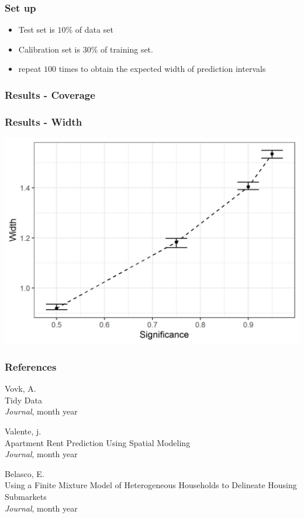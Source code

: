 \documentclass{beamer}
\begin{document}
\begin{frame} \frametitle{Set up}
\begin{itemize}
	\item Test set is $10\%$ of data set
	\item Calibration set is $30\%$ of training set.
	\item repeat $100$ times to obtain the expected width of prediction intervals	
\end{itemize}
\end{frame}

\begin{frame} \frametitle{Results - Coverage}  

\end{frame}

\begin{frame} \frametitle{Results - Width}    
\includegraphics[scale = 0.8]{conformal.jpeg}
\end{frame}







\begin{frame}
\frametitle{References}
\footnotesize{
	\begin{thebibliography}{99} %
		
		 Vovk, A. \\
		\newblock Tidy Data\\
		\newblock \emph{Journal}, month year
		
		 Valente, j. \\
		\newblock Apartment Rent Prediction Using Spatial Modeling\\
		\newblock \emph{Journal}, month year
		
		 Belasco, E. \\
		\newblock Using a Finite Mixture Model of Heterogeneous Households to Delineate Housing Submarkets\\
		\newblock \emph{Journal}, month year
		
	\end{thebibliography}
}
\end{frame}
    
\end{document}
